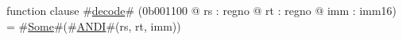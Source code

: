 function clause #\hyperref[zdecode]{decode}# (0b001100 @ rs : regno @ rt : regno @ imm : imm16) =
  #\hyperref[zSome]{Some}#(#\hyperref[zANDI]{ANDI}#(rs, rt, imm))

